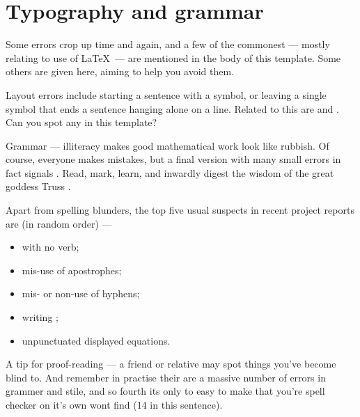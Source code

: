 \chapter{Typography and grammar}\label{app:typo}
Some errors crop up time and again, and a few of the commonest ---
mostly relating to use of \LaTeX\ --- are mentioned in the body of this
template. Some others are given here, aiming to help you avoid them.
\par
Layout errors include starting a sentence with a symbol, or leaving a
single symbol that ends a sentence hanging alone on a line. Related to
this are  and  \cite{WO}. Can you spot any
in this template?
\par
Grammar --- illiteracy makes good mathematical work look like rubbish.
Of course, everyone makes mistakes, but a final version with many small
errors in fact signals .
Read, mark, learn, and inwardly digest the wisdom of the great goddess
Truss \cite{ESL}.
\par
Apart from spelling blunders, the top five usual suspects in recent
project reports are (in random order) ---\begin{itemize}
\item {} with no verb;
\item mis-use of apostrophes;
\item mis- or non-use of hyphens;
\item writing ;
\item unpunctuated displayed equations.
\end{itemize}
A tip for proof-reading --- a friend or relative may spot things you've
become blind to. And remember in practise their are a massive number of
errors in grammer and stile, and so fourth its only to easy to make that
you're spell checker on it's own wont find (14 in this sentence).
